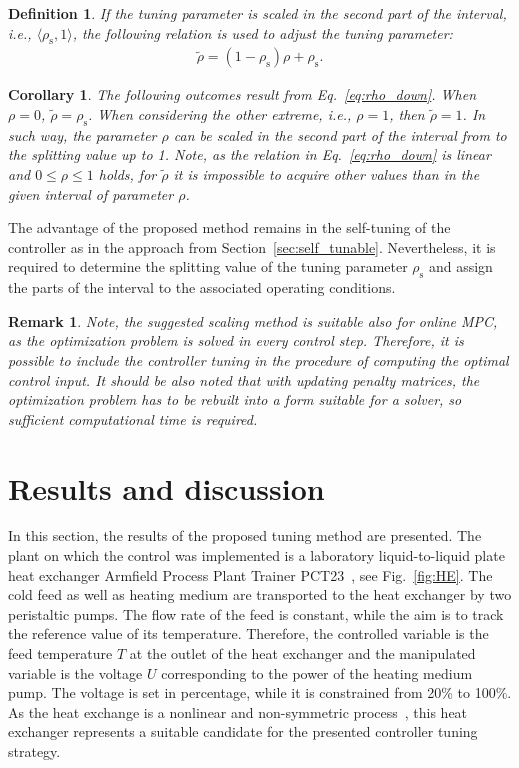 \documentclass[preprint,12pt]{elsarticle}
\newtheorem{remark}[theorem]{Remark}
\newtheorem{corollary}{Corollary}[theorem]
\newtheorem{definition}{Definition}[section]
\begin{document}
\begin{definition}
	If the tuning parameter is scaled in the second part of the interval, i.e., $\langle \rho_{\mathrm{s}}, 1 \rangle$, the following relation is used to adjust the tuning parameter:	
	\begin{eqnarray}
		\label{eq:rho_down}
		\widetilde{\rho} = (1-\rho_{\mathrm{s}}) \rho + \rho_{\mathrm{s}}.
	\end{eqnarray}
\end{definition}

\begin{corollary}
	The following outcomes result from Eq.~\eqref{eq:rho_down}. When $\rho=0$, $\widetilde{\rho} = \rho_{\mathrm{s}}$. When considering the other extreme, i.e., $\rho=1$, then $\widetilde{\rho} = 1$. In such way, the parameter $\rho$ can be scaled in the second part of the interval from to the splitting value up to 1. Note, as the relation in Eq.~\eqref{eq:rho_down} is linear and $0 \le \rho \le 1$ holds, for $\widetilde{\rho}$ it is impossible to acquire other values than in the given interval of parameter $\rho$.
\end{corollary}

The advantage of the proposed method remains in the self-tuning of the controller as in the approach from Section~\ref{sec:self_tunable}. Nevertheless, it is required to determine the splitting value of the tuning parameter $\rho_{\mathrm{s}}$ and assign the parts of the interval to the associated operating conditions.

\begin{remark}
	Note, the suggested scaling method is suitable also for online MPC, as the optimization problem is solved in every control step. Therefore, it is possible to include the controller tuning in the procedure of computing the optimal control input. It should be also noted that with updating penalty matrices, the optimization problem has to be rebuilt into a form suitable for a solver, so sufficient computational time is required.  
\end{remark}

\section{Results and discussion}
\label{sec:results}

In this section, the results of the proposed tuning method are presented. The plant on which the control was implemented is a laboratory liquid-to-liquid plate heat exchanger Armfield Process Plant Trainer PCT23~\cite{pct23}, see Fig.~\ref{fig:HE}. The cold feed as well as heating medium are transported to the heat exchanger by two peristaltic pumps. The flow rate of the feed is constant, while the aim is to track the reference value of its temperature. Therefore, the controlled variable is the feed temperature $T$ at the outlet of the heat exchanger and the manipulated variable is the voltage $U$ corresponding to the power of the heating medium pump. The voltage is set in percentage, while it is constrained from 20\% to 100\%. As the heat exchange is a nonlinear and non-symmetric process~\cite{Liptak}, this heat exchanger represents a suitable candidate for the presented controller tuning strategy.  
\end{document}
